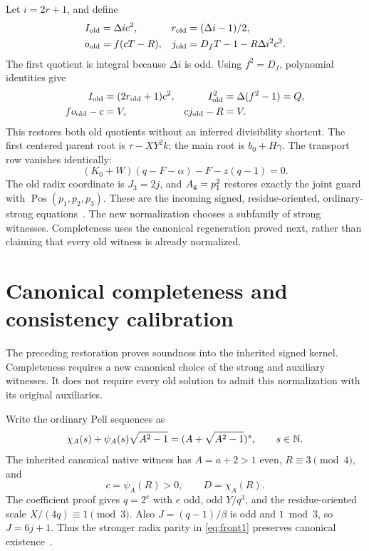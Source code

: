 \documentclass[11pt,a4paper]{article}
\theoremstyle{definition}\newtheorem{definition}[theorem]{Definition}
\theoremstyle{remark}\newtheorem{remark}[theorem]{Remark}
\newcommand{\pos}{\operatorname{Pos}}\newcommand{\Pair}{\operatorname{Pair}}
\newcommand{\Df}{D_f}\newcommand{\Dy}{D_y}\newcommand{\Ag}{A_{\rm g}}
\numberwithin{equation}{section}
\begin{document}
Let \(i=2r+1\), and define
\begin{align}
I_{\rm old}&=\Delta i c^2,&r_{\rm old}&=(\Delta i-1)/2,\nonumber\\
o_{\rm old}&=f(cT-R),&
j_{\rm old}&=\Df T-1-R\Delta i^2c^3.
\label{eq:restore}
\end{align}
The first quotient is integral because \(\Delta i\) is odd.
Using \(f^2=\Df\), polynomial identities give
\begin{align}
I_{\rm old}&=(2r_{\rm old}+1)c^2,&
I_{\rm old}^2&=\Delta(f^2-1)=Q,\nonumber\\
fo_{\rm old}-c&=V,&cj_{\rm old}-R&=V.
\label{eq:restore2}
\end{align}
This restores both old quotients without an inferred divisibility
shortcut. The first centered parent root is \(\tau-XY^2k\);
the main root is \(b_0+H\gamma\).
The transport row vanishes identically:
\[
(K_0+W)(q-F-\alpha)-F-z(q-1)=0.
\]
The old radix coordinate is \(J_3=2j\), and \(\Ag=p_1^2\)
restores exactly the joint guard with \(\pos(p_1,p_2,p_3)\).
These are the incoming signed, residue-oriented,
ordinary-strong equations~\cite{joint,residue}.
The new normalization chooses a subfamily of strong witnesses.
Completeness uses the canonical regeneration proved next, rather
than claiming that every old witness is already normalized.

\section{Canonical completeness and consistency calibration}\label{sec:complete}

The preceding restoration proves soundness into the inherited signed
kernel. Completeness requires a new canonical choice of the strong and
auxiliary witnesses. It does not require every old solution to admit
this normalization with its original auxiliaries.

Write the ordinary Pell sequences as
\[
\chi_A(s)+\psi_A(s)\sqrt{A^2-1}
 =(A+\sqrt{A^2-1})^s,\qquad s\in\mathbb N.
\]
The inherited canonical native witness has \(A=a+2>1\) even,
\(R\equiv3\pmod4\), and
\[
c=\psi_A(R)>0,\qquad D=\chi_A(R).
\]
The coefficient proof gives \(q=2^e\) with \(e\) odd, odd
\(Y/q^3\), and the residue-oriented scale \(X/(4q)\equiv1\pmod3\).
Also \(J=(q-1)/\beta\) is odd and \(1\bmod3\), so \(J=6j+1\).
Thus the stronger radix parity in \eqref{eq:front1} preserves canonical
existence~\cite{coeff,residue}.
\end{document}
